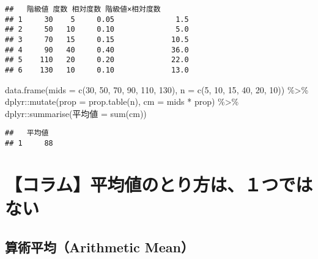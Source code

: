 \documentclass[
  12pt,
]{book}
\newenvironment{Shaded}{\begin{snugshade}}{\end{snugshade}}
\newcommand{\AttributeTok}[1]{\textcolor[rgb]{0.77,0.63,0.00}{#1}}
\newcommand{\DecValTok}[1]{\textcolor[rgb]{0.00,0.00,0.81}{#1}}
\newcommand{\FunctionTok}[1]{\textcolor[rgb]{0.00,0.00,0.00}{#1}}
\newcommand{\NormalTok}[1]{#1}
\newcommand{\OtherTok}[1]{\textcolor[rgb]{0.56,0.35,0.01}{#1}}
\newcommand{\SpecialCharTok}[1]{\textcolor[rgb]{0.00,0.00,0.00}{#1}}
\newcommand{\StringTok}[1]{\textcolor[rgb]{0.31,0.60,0.02}{#1}}
\begin{document}
\begin{verbatim}
##   階級値 度数 相対度数 階級値×相対度数
## 1     30    5     0.05              1.5
## 2     50   10     0.10              5.0
## 3     70   15     0.15             10.5
## 4     90   40     0.40             36.0
## 5    110   20     0.20             22.0
## 6    130   10     0.10             13.0
\end{verbatim}

\begin{Shaded}
\begin{Highlighting}[]
\FunctionTok{data.frame}\NormalTok{(}\AttributeTok{mids =} \FunctionTok{c}\NormalTok{(}\DecValTok{30}\NormalTok{, }\DecValTok{50}\NormalTok{, }\DecValTok{70}\NormalTok{, }\DecValTok{90}\NormalTok{, }\DecValTok{110}\NormalTok{, }\DecValTok{130}\NormalTok{), }\AttributeTok{n =} \FunctionTok{c}\NormalTok{(}\DecValTok{5}\NormalTok{, }\DecValTok{10}\NormalTok{, }\DecValTok{15}\NormalTok{, }\DecValTok{40}\NormalTok{, }\DecValTok{20}\NormalTok{, }\DecValTok{10}\NormalTok{)) }\SpecialCharTok{\%\textgreater{}\%} 
\NormalTok{  dplyr}\SpecialCharTok{::}\FunctionTok{mutate}\NormalTok{(}\AttributeTok{prop =} \FunctionTok{prop.table}\NormalTok{(n), }\AttributeTok{cm =}\NormalTok{ mids }\SpecialCharTok{*}\NormalTok{ prop) }\SpecialCharTok{\%\textgreater{}\%} 
\NormalTok{  dplyr}\SpecialCharTok{::}\FunctionTok{summarise}\NormalTok{(}\StringTok{\textasciigrave{}}\AttributeTok{平均値}\StringTok{\textasciigrave{}} \OtherTok{=} \FunctionTok{sum}\NormalTok{(cm))}
\end{Highlighting}
\end{Shaded}

\begin{verbatim}
##   平均値
## 1     88
\end{verbatim}

\hypertarget{ux30b3ux30e9ux30e0ux5e73ux5747ux5024ux306eux3068ux308aux65b9ux306fuxff11ux3064ux3067ux306fux306aux3044}{%
\section*{【コラム】平均値のとり方は、１つではない}\label{ux30b3ux30e9ux30e0ux5e73ux5747ux5024ux306eux3068ux308aux65b9ux306fuxff11ux3064ux3067ux306fux306aux3044}}

\hypertarget{ux7b97ux8853ux5e73ux5747arithmetic-mean}{%
\subsection*{算術平均（Arithmetic Mean）}\label{ux7b97ux8853ux5e73ux5747arithmetic-mean}}
\end{document}
